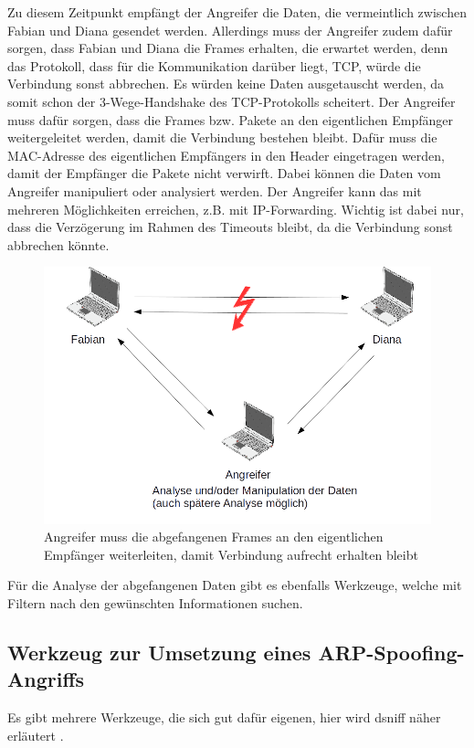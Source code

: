 Zu diesem Zeitpunkt empfängt der Angreifer die Daten, die vermeintlich zwischen Fabian und Diana gesendet werden. Allerdings muss der Angreifer zudem dafür sorgen, dass Fabian und Diana die Frames erhalten, die erwartet werden, denn das Protokoll, dass für die Kommunikation darüber liegt, TCP, würde die Verbindung sonst abbrechen. Es würden keine Daten ausgetauscht werden, da somit schon der 3-Wege-Handshake des TCP-Protokolls scheitert.
Der Angreifer muss dafür sorgen, dass die Frames bzw. Pakete an den eigentlichen Empfänger weitergeleitet werden, damit die Verbindung bestehen bleibt. Dafür muss die MAC-Adresse des eigentlichen Empfängers in den Header eingetragen werden, damit der Empfänger die Pakete nicht verwirft. Dabei können die Daten vom Angreifer manipuliert oder analysiert werden. Der Angreifer kann das mit mehreren Möglichkeiten erreichen, z.B. mit IP-Forwarding. Wichtig ist dabei nur, dass die Verzögerung im Rahmen des Timeouts bleibt, da die Verbindung sonst abbrechen könnte.
\begin{figure}[H]
	\centering
	\includegraphics[width=1\linewidth]{images/ARP-Tabelle-manipuliert_1.png}
	\caption{Angreifer muss die abgefangenen Frames an den eigentlichen Empfänger weiterleiten, damit Verbindung aufrecht erhalten bleibt \cite{ARP-Tabelle-Bild-2} }
\end{figure}
Für die Analyse der abgefangenen Daten gibt es ebenfalls Werkzeuge, welche mit Filtern nach den gewünschten Informationen suchen.

\subsection{Werkzeug zur Umsetzung eines ARP-Spoofing-Angriffs}
Es gibt mehrere Werkzeuge, die sich gut dafür eigenen, hier wird dsniff näher erläutert \cite[vgl.]{dsniff_monkey}.

